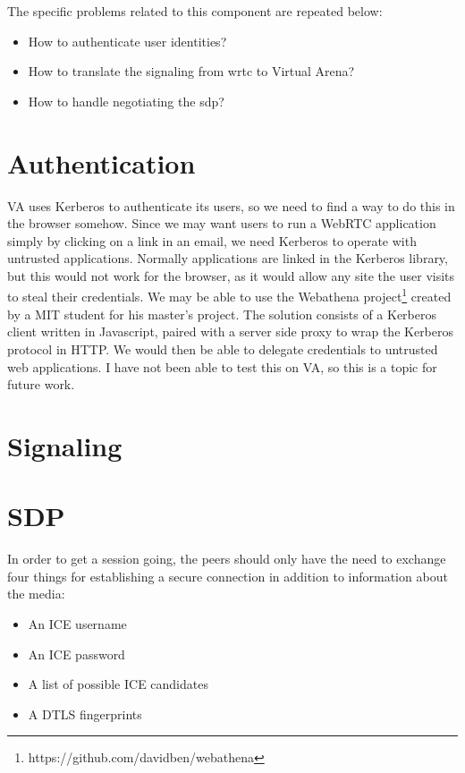 The specific problems related to this component are repeated below:

\begin{itemize}
\item{How to authenticate user identities?}
\item{How to translate the signaling from \gls{wrtc} to Virtual Arena?}
\item{How to handle negotiating the \gls{sdp}?}
\end{itemize}

\section{Authentication}
VA uses Kerberos to authenticate its users, so we need to find a way to do this in the browser somehow. Since we may want users to run a WebRTC application simply by clicking on a link in an email, we need Kerberos to operate with untrusted applications. Normally applications are linked in the Kerberos library, but this would not work for the browser, as it would allow any site the user visits to steal their credentials\cite{vk}. We may be able to use the Webathena project\footnote{https://github.com/davidben/webathena} created by a MIT student for his master's project\cite{vk}. The solution consists of a Kerberos client written in Javascript, paired with a server side proxy to wrap the Kerberos protocol in HTTP. We would then be able to delegate credentials to untrusted web applications. I have not been able to test this on VA, so this is a topic for future work.

\section{Signaling}




\section{SDP}
In order to get a session going, the peers should only have the need to exchange four things for establishing a secure connection in addition to information about the media:

\begin{itemize}
\item{An ICE username}
\item{An ICE password}
\item{A list of possible ICE candidates}
\item{A DTLS fingerprint}s
\end{itemize}

